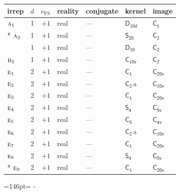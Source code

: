 \documentclass[10pt,a4paper]{article}
\newcommand{\needspace}[1]{\par\penalty-100\begingroup\dimen0=#1\relax\dimen2=\pagegoal
  \advance\dimen2-\pagetotal\ifdim\dimen0>\dimen2\relax\ifdim\dimen2>0pt\vfil\break\fi\fi
  \endgroup}
\numberwithin{equation}{section}
\newcommand{\grp}[1]{\mathsf{#1}}
\newcommand{\irr}[1]{\text{\normalfont\scshape #1}}
\newcommand{\detbox}[1]{{\setlength{\fboxsep}{1pt}\fbox{#1}}}
\newcommand{\clsletter}[1]{\,{\scriptsize\color{black!55}#1}}
\newcommand{\fsind}{\nu_{\mathrm{FS}}}
\begin{document}
{\small\renewcommand{\arraystretch}{1.25}\begin{longtable}{@{}lrrllll@{}}\toprule
irrep & $d$ & $\fsind$ & reality & conjugate & kernel & image\\\midrule\endhead
\bottomrule\endfoot\endlastfoot
$\irr{a}_{1}$ & 1 & $+1$ & real & --- & \href{D10d.pdf}{$\grp{D_{10d}}$} & \href{C1.pdf}{$\grp{C_{1}}$}\\*
$\irr{a}_{2}$ & 1 & $+1$ & real & --- & \href{S20.pdf}{$\grp{S_{20}}$} & \href{C2.pdf}{$\grp{C_{2}}$}\\
\detbox{$\irr{b}_{1}$} & 1 & $+1$ & real & --- & \href{D10.pdf}{$\grp{D_{10}}$} & \href{C2.pdf}{$\grp{C_{2}}$}\\
$\irr{b}_{2}$ & 1 & $+1$ & real & --- & \href{C10v.pdf}{$\grp{C_{10v}}$} & \href{C2.pdf}{$\grp{C_{2}}$}\\
$\irr{e}_{1}$ & 2 & $+1$ & real & --- & \href{C1.pdf}{$\grp{C_{1}}$} & $\grp{C_{20v}}$\\
$\irr{e}_{2}$ & 2 & $+1$ & real & --- & \href{C2.pdf}{$\grp{C_{2}}$}\clsletter{a} & \href{C10v.pdf}{$\grp{C_{10v}}$}\\
$\irr{e}_{3}$ & 2 & $+1$ & real & --- & \href{C1.pdf}{$\grp{C_{1}}$} & $\grp{C_{20v}}$\\
$\irr{e}_{4}$ & 2 & $+1$ & real & --- & \href{S4.pdf}{$\grp{S_{4}}$} & \href{C5v.pdf}{$\grp{C_{5v}}$}\\
$\irr{e}_{5}$ & 2 & $+1$ & real & --- & \href{C5.pdf}{$\grp{C_{5}}$} & \href{C4v.pdf}{$\grp{C_{4v}}$}\\
$\irr{e}_{6}$ & 2 & $+1$ & real & --- & \href{C2.pdf}{$\grp{C_{2}}$}\clsletter{a} & \href{C10v.pdf}{$\grp{C_{10v}}$}\\
$\irr{e}_{7}$ & 2 & $+1$ & real & --- & \href{C1.pdf}{$\grp{C_{1}}$} & $\grp{C_{20v}}$\\
$\irr{e}_{8}$ & 2 & $+1$ & real & --- & \href{S4.pdf}{$\grp{S_{4}}$} & \href{C5v.pdf}{$\grp{C_{5v}}$}\\*
$\irr{e}_{9}$ & 2 & $+1$ & real & --- & \href{C1.pdf}{$\grp{C_{1}}$} & $\grp{C_{20v}}$\\
\bottomrule\end{longtable}}
\needspace{146pt}
\end{document}
